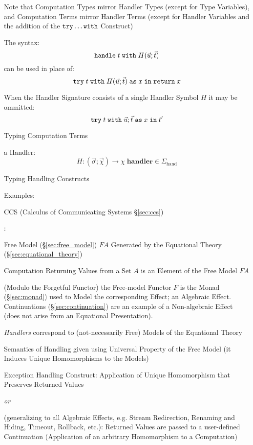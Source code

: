 \fist Note that Computation Types mirror Handler Types (except
for Type Variables), and Computation Terms mirror Handler Terms
(except for Handler Variables and the addition of the
$\mathtt{try}\ldots\mathtt{with}$ Construct)

The syntax:
\[
  \mathtt{handle}\; t \;\mathtt{with}\;
  H(\vec{u};\vec{t})
\]
can be used in place of:
\[
    \mathtt{try}\; t \;\mathtt{with}\; H(\vec{u};
      \vec{t}) \;\mathtt{as}\; x \;\mathtt{in\;return}\; x
\]

When the Handler Signature consists of a single Handler Symbol $H$ it
may be ommitted:
\[
    \mathtt{try}\; t \;\mathtt{with}\; \vec{u};
      \vec{t} \;\mathtt{as}\; x \;\mathtt{in}\; t'
\]

Typing Computation Terms

a Handler:
\[
  H : (\vec{\sigma}; \vec{\chi})
    \rightarrow \chi \;\mathbf{handler} \in \Sigma_\mathrm{hand}
\]

Typing Handling Constructs

Examples: \cite{plotkin-pretnar09}

CCS (Calculus of Communicating Systems \S\ref{sec:ccs})




\cite{plotkin-pretnar13}:

Free Model (\S\ref{sec:free_model}) $F A$ Generated by the Equational
Theory (\S\ref{sec:equational_theory})

Computation Returning Values from a Set $A$ is an Element of the Free
Model $F A$

(Modulo the Forgetful Functor) the Free-model Functor $F$ is the Monad
(\S\ref{sec:monad}) used to Model the corresponding Effect; an
Algebraic Effect. Continuations (\S\ref{sec:continuation}) are an
example of a Non-algebraic Effect (does not arise from an Equational
Presentation).

\emph{Handlers} correspond to (not-necessarily Free) Models of the
Equational Theory

Semantics of Handling given using Universal Property of the Free Model
(it Induces Unique Homomorphisms to the Models)

Exception Handling Construct: Application of Unique Homomorphism that
Preserves Returned Values

\emph{or}

(generalizing to all Algebraic Effects, e.g. Stream Redirection,
Renaming and Hiding, Timeout, Rollback, etc.): Returned Values are
passed to a user-defined Continuation (Application of an arbitrary
Homomorphism to a Computation)


